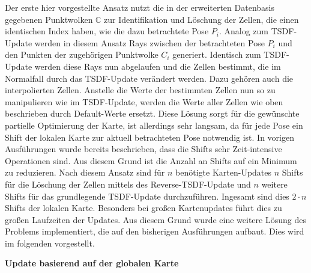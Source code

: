 Der erste hier vorgestellte Ansatz nutzt die in der erweiterten Datenbasis gegebenen Punktwolken $\mathbb{C}$ zur Identifikation und Löschung der Zellen, die einen identischen Index haben, wie die dazu betrachtete Pose $P_i$. Analog zum TSDF-Update werden in diesem Ansatz Rays zwischen der betrachteten Pose $P_i$ und den Punkten der zugehörigen Punktwolke $C_i$ generiert. Identisch zum TSDF-Update werden diese Rays nun abgelaufen und die Zellen bestimmt, die im Normalfall durch das TSDF-Update verändert werden. Dazu gehören auch die interpolierten Zellen. Anstelle die Werte der bestimmten Zellen nun so zu manipulieren wie im TSDF-Update, werden die Werte aller Zellen wie oben beschrieben durch Default-Werte ersetzt. Diese Lösung sorgt für die gewünschte partielle Optimierung der Karte, ist allerdings sehr langsam, da für jede Pose ein Shift der lokalen Karte zur aktuell betrachteten Pose notwendig ist. In vorigen Ausführungen wurde bereits beschrieben, dass die Shifts sehr Zeit-intensive Operationen sind. Aus diesem Grund ist die Anzahl an Shifts auf ein Minimum zu reduzieren. Nach diesem Ansatz sind für $n$ benötigte Karten-Updates $n$ Shifts für die Löschung der Zellen mittels des Reverse-TSDF-Update und $n$ weitere Shifts für das grundlegende TSDF-Update durchzuführen. Ingesamt sind dies $2 \cdot n$ Shifts der lokalen Karte. Besonders bei großen Kartenupdates führt dies zu großen Laufzeiten der Updates. Aus diesem Grund wurde eine weitere Lösung des Problems implementiert, die auf den bisherigen Ausführungen aufbaut. Dies wird im folgenden vorgestellt.

\textbf{Update basierend auf der globalen Karte}

